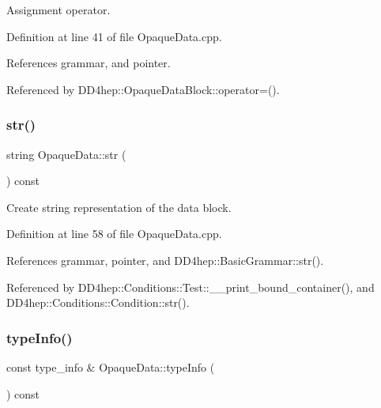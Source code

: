 Assignment operator. 



Definition at line 41 of file Opaque\+Data.\+cpp.



References grammar, and pointer.



Referenced by D\+D4hep\+::\+Opaque\+Data\+Block\+::operator=().

\hypertarget{class_d_d4hep_1_1_opaque_data_a96ef1102e86ea3ef3b2494c1686c300a}{}\label{class_d_d4hep_1_1_opaque_data_a96ef1102e86ea3ef3b2494c1686c300a} 
\subsubsection{\texorpdfstring{str()}{str()}}
{\footnotesize\ttfamily string Opaque\+Data\+::str (\begin{DoxyParamCaption}{ }\end{DoxyParamCaption}) const}



Create string representation of the data block. 



Definition at line 58 of file Opaque\+Data.\+cpp.



References grammar, pointer, and D\+D4hep\+::\+Basic\+Grammar\+::str().



Referenced by D\+D4hep\+::\+Conditions\+::\+Test\+::\+\_\+\+\_\+print\+\_\+bound\+\_\+container(), and D\+D4hep\+::\+Conditions\+::\+Condition\+::str().

\hypertarget{class_d_d4hep_1_1_opaque_data_af2e5807d6c75103481dc89ee7152faa3}{}\label{class_d_d4hep_1_1_opaque_data_af2e5807d6c75103481dc89ee7152faa3} 
\subsubsection{\texorpdfstring{type\+Info()}{typeInfo()}}
{\footnotesize\ttfamily const type\+\_\+info \& Opaque\+Data\+::type\+Info (\begin{DoxyParamCaption}{ }\end{DoxyParamCaption}) const}



